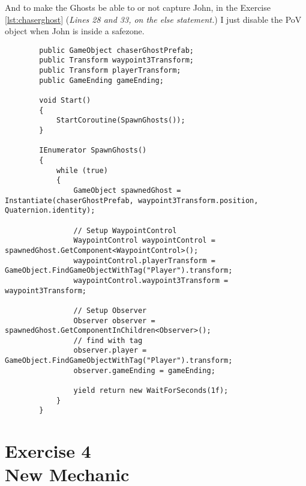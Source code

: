     And to make the Ghosts be able to or not capture John, in the Exercise \ref{lst:chaserghost} (\textit{Lines 28 and 33, on the else statement.}) I just disable the PoV object when John is inside a safezone.
    \begin{verbatim}
        public GameObject chaserGhostPrefab;
        public Transform waypoint3Transform;
        public Transform playerTransform;
        public GameEnding gameEnding;

        void Start()
        {
            StartCoroutine(SpawnGhosts());
        }

        IEnumerator SpawnGhosts()
        {
            while (true)
            {
                GameObject spawnedGhost = Instantiate(chaserGhostPrefab, waypoint3Transform.position, Quaternion.identity);

                // Setup WaypointControl
                WaypointControl waypointControl = spawnedGhost.GetComponent<WaypointControl>();
                waypointControl.playerTransform = GameObject.FindGameObjectWithTag("Player").transform;
                waypointControl.waypoint3Transform = waypoint3Transform;

                // Setup Observer
                Observer observer = spawnedGhost.GetComponentInChildren<Observer>();
                // find with tag
                observer.player = GameObject.FindGameObjectWithTag("Player").transform;
                observer.gameEnding = gameEnding;

                yield return new WaitForSeconds(1f);
            }
        }
    \end{verbatim}
\newpage
\section[Exercise 4. New Mechanic]{Exercise 4\\ {\large New Mechanic}}


